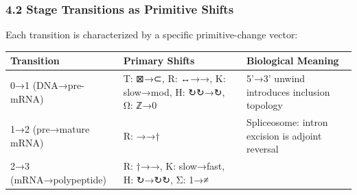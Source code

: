 \hypertarget{stage-transitions-as-primitive-shifts}{%
\subsubsection{4.2 Stage Transitions as Primitive
Shifts}\label{stage-transitions-as-primitive-shifts}}

Each transition is characterized by a specific primitive-change vector:

\begin{longtable}[]{@{}lll@{}}
\toprule
\begin{minipage}[b]{0.24\columnwidth}\raggedright
Transition\strut
\end{minipage} & \begin{minipage}[b]{0.30\columnwidth}\raggedright
Primary Shifts\strut
\end{minipage} & \begin{minipage}[b]{0.38\columnwidth}\raggedright
Biological Meaning\strut
\end{minipage}\tabularnewline
\midrule
\endhead
\begin{minipage}[t]{0.24\columnwidth}\raggedright
0→1 (DNA→pre-mRNA)\strut
\end{minipage} & \begin{minipage}[t]{0.30\columnwidth}\raggedright
T: ⊠→⊂, R: ↔→→, K: slow→mod, H: ↻↻→↻, Ω: ℤ→0\strut
\end{minipage} & \begin{minipage}[t]{0.38\columnwidth}\raggedright
5'→3' unwind introduces inclusion topology\strut
\end{minipage}\tabularnewline
\begin{minipage}[t]{0.24\columnwidth}\raggedright
1→2 (pre→mature mRNA)\strut
\end{minipage} & \begin{minipage}[t]{0.30\columnwidth}\raggedright
R: →→†\strut
\end{minipage} & \begin{minipage}[t]{0.38\columnwidth}\raggedright
Spliceosome: intron excision is adjoint reversal\strut
\end{minipage}\tabularnewline
\begin{minipage}[t]{0.24\columnwidth}\raggedright
2→3 (mRNA→polypeptide)\strut
\end{minipage} & \begin{minipage}[t]{0.30\columnwidth}\raggedright
R: †→→, K: slow→fast, H: ↻→↻↻, Σ: 1→≠\strut
\end{minipage} & \begin{minipage}[t]{0.38\columnwidth}\raggedright

\end{minipage}
\end{longtable}
